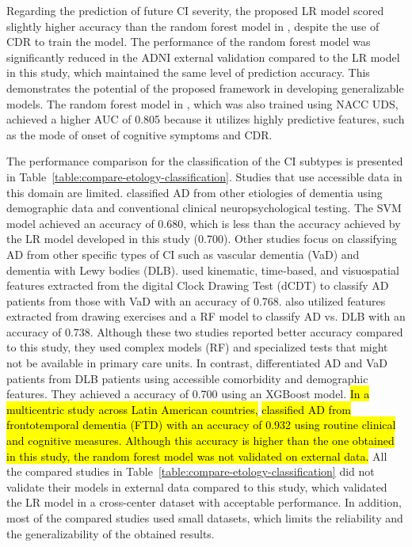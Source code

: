 Regarding the prediction of future CI severity, the proposed LR model scored slightly higher accuracy than the random forest model in \cite{abbas2024Explainable}, despite the use of CDR to train the model. The performance of the random forest model was significantly reduced in the ADNI external validation compared to the LR model in this study, which maintained the same level of prediction accuracy. This demonstrates the potential of the proposed framework in developing generalizable models. The random forest model in \cite{Pang2023Predicting}, which was also trained using NACC UDS, achieved a higher AUC of 0.805 because it utilizes highly predictive features, such as the mode of onset of cognitive symptoms and CDR.

The performance comparison for the classification of the CI subtypes is presented in Table~\ref{table:compare-etology-classification}. Studies that use accessible data in this domain are limited.  classified AD from other etiologies of dementia using demographic data and conventional clinical neuropsychological testing. The SVM model achieved an accuracy of 0.680, which is less than the accuracy achieved by the LR model developed in this study (0.700). Other studies focus on classifying AD from other specific types of CI such as vascular dementia (\acrshort{VaD}) and dementia with Lewy bodies (\acrshort{DLB}).  used kinematic, time‑based, and visuospatial features extracted from the digital Clock Drawing Test (dCDT) to classify AD patients from those with VaD with an accuracy of 0.768.  also utilized features extracted from drawing exercises and a RF model to classify AD vs. DLB with an accuracy of 0.738. Although these two studies reported better accuracy compared to this study, they used complex models (RF) and specialized tests that might not be available in primary care units. In contrast,  differentiated AD and VaD patients from DLB patients using accessible comorbidity and demographic features. They achieved a accuracy of 0.700 using an XGBoost model. \hl{In a multicentric study across Latin American countries,}  \hl{classified AD from frontotemporal dementia (FTD) with an accuracy of 0.932 using routine clinical and cognitive measures. Although this accuracy is higher than the one obtained in this study, the random forest model was not validated on external data.} All the compared studies in Table~\ref{table:compare-etology-classification} did not validate their models in external data compared to this study, which validated the LR model in a cross-center dataset with acceptable performance. In addition, most of the compared studies used small datasets, which limits the reliability and the generalizability of the obtained results.


